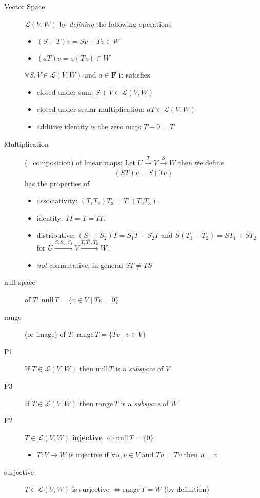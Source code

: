 \documentclass[11pt,notitlepage,oneside]{article}
\newcommand{\nullspace}[1]{\mathrm{null}\,{#1}}
\newcommand{\rangespace}[1]{\mathrm{range}\,{#1}}
\begin{document}
\begin{description}
  \item[Vector Space] $\mathcal{L}(V,W)$  by \emph{defining} the following operations
  \begin{itemize}
  \item $(S+T)v = Sv + Tv \in W$ 
  \item $(aT)v = a(Tv) \in W$
  \end{itemize}
  $\forall S,V \in \mathcal{L}(V,W)$ and $a\in\mathbf{F}$ it satisfies
  \begin{itemize}
  \item closed under sum: $S+V \in \mathcal{L}(V,W)$
  \item closed under scalar multiplication: $aT \in \mathcal{L}(V,W)$
  \item additive identity is the zero map: $T+0=T$
  \end{itemize}
  \item[Multiplication] (=composition) of linear maps: Let $U \xrightarrow{T} V \xrightarrow{S} W$ then we define
  \begin{align*}
  (ST)v = S(Tv)
  \end{align*}
  has the properties of
  \begin{itemize}
  \item associativity: $(T_1T_2)T_3 = T_1(T_2T_3)$.
  \item identity: $TI = T = IT$.
  \item distributive: $(S_1+S_2)T = S_1T+S_2T$ and $S(T_1+T_2) = ST_1 +ST_2$ for $U\xrightarrow{S,S_1,S_1} V \xrightarrow{T,T_1,T_2} W$.
  \item \emph{not} conmutative: in general $ST \neq TS $
  \end{itemize}
  \item[null space\label{itm:D3_nullspace}] of $T$: $\nullspace{T} = \{v\in V \mid Tv=0\}$
  \item[range] (or image) of $T$: $\rangespace{T} = \{Tv \mid v\in V\}$
  \item[P1]If $T\in\mathcal{L}(V,W)$ then $\nullspace{T}$ is a \emph{subspace} of $V$
  \item[P3]If $T\in\mathcal{L}(V,W)$ then $\rangespace{T}$ is a \emph{subspace} of $W$
  \item[P2\label{itm:T3_2}]$T\in\mathcal{L}(V,W)$ \textbf{injective} $\iff \nullspace{T}=\{0\}$
  \begin{itemize}
  \item $T:V\to W$ is injective if $\forall u,v \in V$ and $Tu=Tv$ then $u=v$
  \end{itemize}
  \item[surjective] $T\in\mathcal{L}(V,W)$ is surjective $\iff  \rangespace{T} = W$ (by definition)

\end{description}
\end{document}
